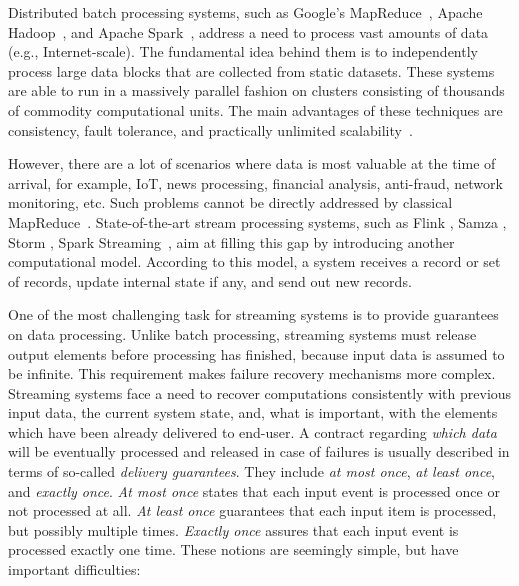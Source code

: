 
\label {fs-intro-seciton}

Distributed batch processing systems, such as Google's MapReduce~\cite{Dean:2008:MSD:1327452.1327492}, Apache Hadoop~\cite{hadoop2009hadoop}, and Apache Spark~\cite{Zaharia:2016:ASU:3013530.2934664}, address a need to process vast amounts of data (e.g., Internet-scale). The fundamental idea behind them is to independently process large data blocks that are collected from static datasets. These systems are able to run in a massively parallel fashion on clusters consisting of thousands of commodity computational units. The main advantages of these techniques are consistency, fault tolerance, and practically unlimited scalability~\cite{borthakur2011apache}.


However, there are a lot of scenarios where data is most valuable at the time of arrival, for example, IoT, news processing, financial analysis, anti-fraud, network monitoring, etc. Such problems cannot be directly addressed by classical MapReduce~\cite{Doulkeridis:2014:SLA:2628707.2628782}. State-of-the-art stream processing systems, such as Flink \cite{carbone2015apache}, Samza \cite{Noghabi:2017:SSS:3137765.3137770}, Storm \cite{apache:storm}, Spark Streaming~\cite{Zaharia:2012:DSE:2342763.2342773}, aim at filling this gap by introducing another computational model. According to this model, a system receives a record or set of records, update internal state if any, and send out new records. 

One of the most challenging task for streaming systems is to provide guarantees on data processing. Unlike batch processing, streaming systems must release output elements before processing has finished, because input data is assumed to be infinite. This requirement makes failure recovery mechanisms more complex. Streaming systems face a need to recover computations consistently with previous input data, the current system state, and, what is important, with the elements which have been already delivered to end-user. A contract regarding {\em which data} will be eventually processed and released in case of failures is usually described in terms of so-called {\em delivery guarantees}. They include {\em at most once}, {\em at least once}, and {\em exactly once}. {\it At most once} states that each input event is processed once or not processed at all. {\it At least once} guarantees that each input item is processed, but possibly multiple times. {\it Exactly once} assures that each input event is processed exactly one time. These notions are seemingly simple, but have important difficulties:

